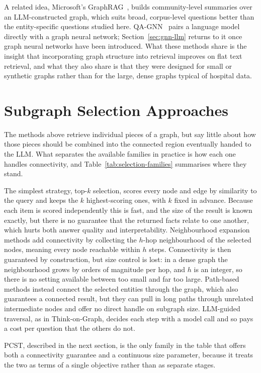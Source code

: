 A related idea, Microsoft's GraphRAG~\cite{edge2024graphrag}, builds
community-level summaries over an LLM-constructed graph, which suits broad,
corpus-level questions better than the entity-specific questions studied here.
QA-GNN~\cite{yasunaga2021qagnn} pairs a language model directly with a graph
neural network; Section~\ref{sec:gnn-llm} returns to it once graph neural
networks have been introduced. What these methods share is the insight that
incorporating graph structure into retrieval improves on flat text retrieval, and
what they also share is that they were designed for small or synthetic graphs
rather than for the large, dense graphs typical of hospital data.

\section{Subgraph Selection Approaches} \label{sec:subgraph-selection-approaches}

The methods above retrieve individual pieces of a graph, but say little about how
those pieces should be combined into the connected region eventually handed to
the LLM. What separates the available families in practice is how each one
handles connectivity, and Table~\ref{tab:selection-families} summarises where
they stand.

The simplest strategy, top-$k$ selection, scores every node and edge by
similarity to the query and keeps the $k$ highest-scoring ones, with $k$ fixed in
advance. Because each item is scored independently this is fast, and the size of
the result is known exactly, but there is no guarantee that the returned facts
relate to one another, which hurts both answer quality and interpretability.
Neighbourhood expansion methods add connectivity by collecting the $h$-hop
neighbourhood of the selected nodes, meaning every node reachable within $h$
steps. Connectivity is then guaranteed by construction, but size control is lost:
in a dense graph the neighbourhood grows by orders of magnitude per hop, and $h$
is an integer, so there is no setting available between too small and far too
large. Path-based methods instead connect the selected entities through the
graph, which also guarantees a connected result, but they can pull in long paths
through unrelated intermediate nodes and offer no direct handle on subgraph size.
LLM-guided traversal, as in Think-on-Graph, decides each step with a model call
and so pays a cost per question that the others do not.

PCST, described in the next section, is the only family in the table that offers
both a connectivity guarantee and a continuous size parameter, because it treats
the two as terms of a single objective rather than as separate stages.

